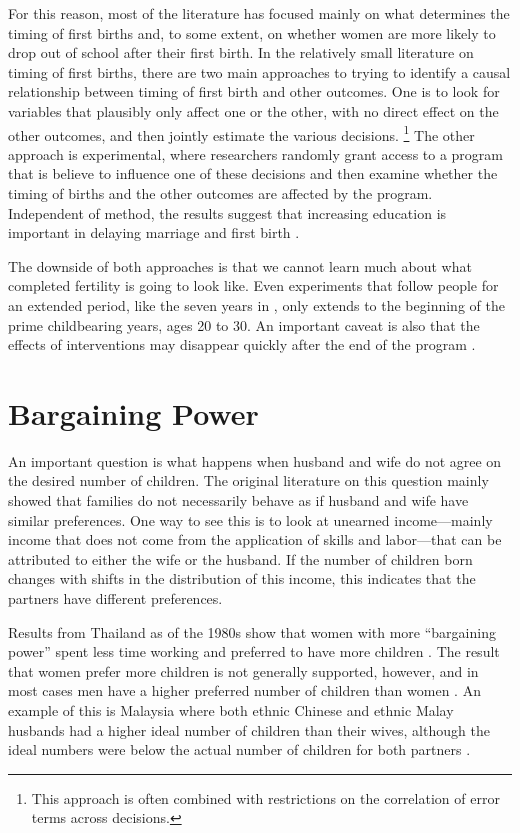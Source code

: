 \documentclass[letterpaper,12pt]{article}
\begin{document}
For this reason, most of the literature has focused mainly on what
determines the timing of first births and, to some extent, on whether
women are more likely to drop out of school after their first birth. 
In the relatively small literature on timing of first births, there are
two main approaches to trying to identify a causal relationship between
timing of first birth and other outcomes. 
One is to look for variables that plausibly only affect one or the
other, with no direct effect on the other outcomes, and then jointly
estimate the various decisions.%
\footnote{
This approach is often combined with restrictions on the correlation of
error terms across decisions.} 
The other approach is experimental, where researchers randomly grant
access to a program that is believe to influence one of these decisions
and then examine whether the timing of births and the other outcomes are
affected by the program. 
Independent of method, the results suggest that increasing education is
important in delaying marriage and first birth
\citep{Duflo2015,Marchetta2016}.

The downside of both approaches is that we cannot learn much about what
completed fertility is going to look like. 
Even experiments that follow people for an extended period, like the
seven years in \citet{Duflo2015}, only extends to the beginning of the
prime childbearing years, ages 20 to 30. 
An important caveat is also that the effects of interventions may
disappear quickly after the end of the program \citep{Baird2016}.

\section{Bargaining Power}\label{bargaining-power}

An important question is what happens when husband and wife do not agree
on the desired number of children. 
The original literature on this question mainly showed that families do
not necessarily behave as if husband and wife have similar preferences. 
One way to see this is to look at unearned income---mainly income that
does not come from the application of skills and labor---that can be
attributed to either the wife or the husband. 
If the number of children born changes with shifts in the distribution
of this income, this indicates that the partners have different
preferences.

Results from Thailand as of the 1980s show that women with more
``bargaining power'' spent less time working and preferred to have more
children \citep{Schultz1990}. 
The result that women prefer more children is not generally supported,
however, and in most cases men have a higher preferred number of
children than women \citep{Westoff2010}. 
An example of this is Malaysia where both ethnic Chinese and ethnic
Malay husbands had a higher ideal number of children than their wives,
although the ideal numbers were below the actual number of children for
both partners \citep{Rasul2008}.
\end{document}
